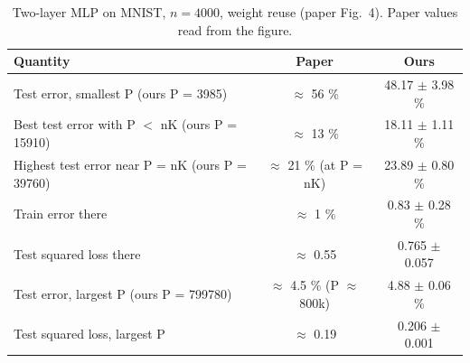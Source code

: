 \begin{table}[h]
  \centering
  \caption{Two-layer MLP on MNIST, $n = 4000$, weight reuse (paper Fig.~4). Paper values read from the figure.}
  \begin{tabular}{lcc}
    \toprule
    Quantity & Paper & Ours \\
    \midrule
    Test error, smallest P (ours P = 3985) & $\approx$ 56 \% & 48.17 $\pm$ 3.98 \% \\
    Best test error with P $<$ nK (ours P = 15910) & $\approx$ 13 \% & 18.11 $\pm$ 1.11 \% \\
    Highest test error near P = nK (ours P = 39760) & $\approx$ 21 \% (at P = nK) & 23.89 $\pm$ 0.80 \% \\
    Train error there & $\approx$ 1 \% & 0.83 $\pm$ 0.28 \% \\
    Test squared loss there & $\approx$ 0.55 & 0.765 $\pm$ 0.057 \\
    Test error, largest P (ours P = 799780) & $\approx$ 4.5 \% (P $\approx$ 800k) & 4.88 $\pm$ 0.06 \% \\
    Test squared loss, largest P & $\approx$ 0.19 & 0.206 $\pm$ 0.001 \\
    \bottomrule
  \end{tabular}
\end{table}
